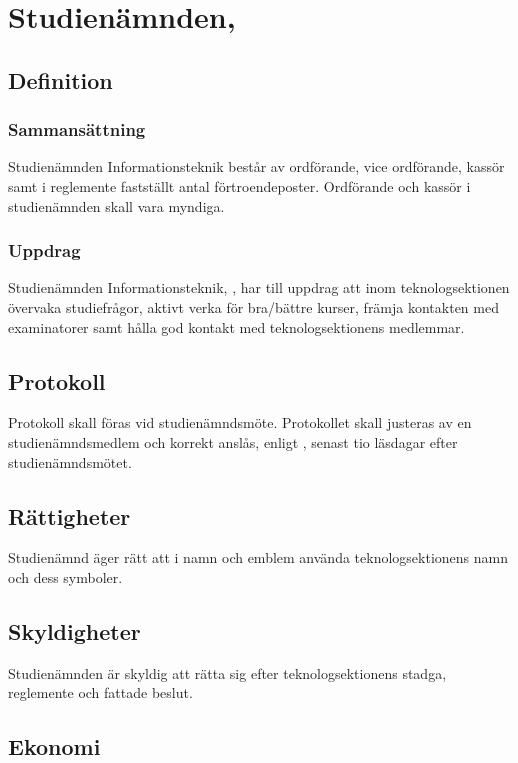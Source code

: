 \section{Studienämnden, \SNIT}

\subsection{Definition}

\subsubsection{Sammansättning}
Studienämnden Informationsteknik består av ordförande, vice ordförande, kassör samt i reglemente fastställt antal förtroendeposter. Ordförande och kassör i studienämnden skall vara myndiga.

\subsubsection{Uppdrag}
Studienämnden Informationsteknik, \SNIT{}, har till uppdrag att inom teknologsektionen övervaka studiefrågor, aktivt verka för bra/bättre kurser, främja kontakten med examinatorer samt hålla god kontakt med teknologsektionens medlemmar.

\subsection{Protokoll}
Protokoll skall föras vid studienämndsmöte. Protokollet skall justeras av en studienämndsmedlem och korrekt anslås, enligt , senast tio läsdagar efter studienämndsmötet.

\subsection{Rättigheter}
Studienämnd äger rätt att i namn och emblem använda teknologsektionens namn och dess symboler.

\subsection{Skyldigheter}
Studienämnden är skyldig att rätta sig efter teknologsektionens stadga, reglemente och fattade beslut.

\subsection{Ekonomi}
